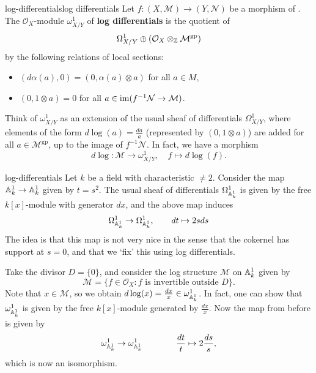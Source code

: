 \begin{topic}{log-differentials}{log differentials}
    Let $f : (X, \mathcal{M}) \to (Y, \mathcal{N})$ be a morphism of . The $\mathcal{O}_X$-module $\omega^1_{X/Y}$ of \textbf{log differentials} is the quotient of
    \[ \Omega_{X/Y}^1 \oplus (\mathcal{O}_X \otimes_\ZZ \mathcal{M}^\text{gp}) \]
    by the following relations of local sections:
    \begin{itemize}
        \item $(d \alpha(a), 0) = (0, \alpha(a) \otimes a)$ for all $a \in M$,
        \item $(0, 1 \otimes a) = 0$ for all $a \in \im(f^{-1} \mathcal{N} \to \mathcal{M})$.
    \end{itemize}
    
    Think of $\omega^1_{X/Y}$ as an extension of the usual sheaf of differentials $\Omega_{X/Y}^1$, where elements of the form $d \log(a) = \frac{da}{a}$ (represented by $(0, 1 \otimes a)$) are added for all $a \in \mathcal{M}^\text{gp}$, up to the image of $f^{-1} \mathcal{N}$. In fact, we have a morphism
    \[ d \log : \mathcal{M} \to \omega_{X/Y}^1, \quad f \mapsto d \log(f) . \]
\end{topic}

\begin{example}{log-differentials}
    Let $k$ be a field with characteristic $\ne 2$. Consider the map $\AA^1_k \to \AA^1_k$ given by $t = s^2$. The usual sheaf of differentials $\Omega^1_{\AA^1_k}$ is given by the free $k[x]$-module with generator $d x$, and the above map induces
    \[ \Omega^1_{\AA^1_k} \to \Omega^1_{\AA^1_k}, \qquad d t \mapsto 2 s d s \]
    The idea is that this map is not very nice in the sense that the cokernel has support at $s = 0$, and that we `fix' this using log differentials.
    
    Take the divisor $D = \{ 0 \}$, and consider the log structure $\mathcal{M}$ on $\AA^1_k$ given by
    \[ \mathcal{M} = \{ f \in \mathcal{O}_X : f \text{ is invertible outside } D \} . \]
    Note that $x \in \mathcal{M}$, so we obtain $d \log(x) = \frac{d x}{x} \in \omega^1_{\AA^1_k}$. In fact, one can show that $\omega^1_{\AA^1_k}$ is given by the free $k[x]$-module generated by $\frac{d x}{x}$. Now the map from before is given by
    \[ \omega^1_{\AA^1_k} \to \omega^1_{\AA^1_k} \qquad  \qquad \frac{d t}{t} \mapsto 2 \frac{d s} s , \]
    which is now an isomorphism.
\end{example}

